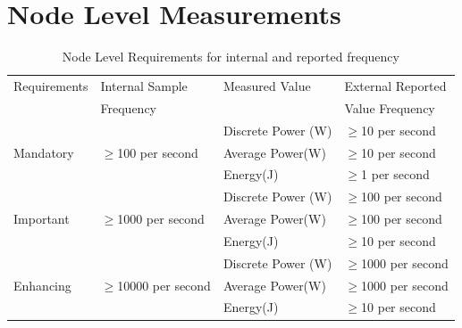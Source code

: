 \section{Node Level Measurements}

\begin{table}[htbp]
\caption{Node Level Requirements for internal and reported frequency}
\label{tab:nodelevel}
\centering
\begin{tabular}{ |l|l|l|l| }
\hline
Requirements & Internal Sample & Measured Value & External Reported \\
 & Frequency & & Value Frequency \\
\hline

\multirow{3}{*}{Mandatory} & \multirow{3}{*}{\mbox{$ \ge $}100 per second} &
Discrete Power (W) & \mbox{$ \ge $}10 per second \\  
 & & Average Power(W) & \mbox{$ \ge $}10 per second \\  
 & & Energy(J) & \mbox{$ \ge $}1 per second \\  \hline

\multirow{3}{*}{Important} & \multirow{3}{*}{\mbox{$ \ge $}1000 per second} &   
Discrete Power (W) & \mbox{$ \ge $}100 per second \\  
 & & Average Power(W) & \mbox{$ \ge $}100 per second \\  
 & & Energy(J) & \mbox{$ \ge $}10 per second \\  \hline

\multirow{3}{*}{Enhancing} & \multirow{3}{*}{\mbox{$ \ge $}10000 per second} & 
Discrete Power (W) & \mbox{$ \ge $}1000 per second \\  
 & & Average Power(W) & \mbox{$ \ge $}1000 per second \\  
 & & Energy(J) & \mbox{$ \ge $}10 per second \\  \hline

\end{tabular}
\end{table}

